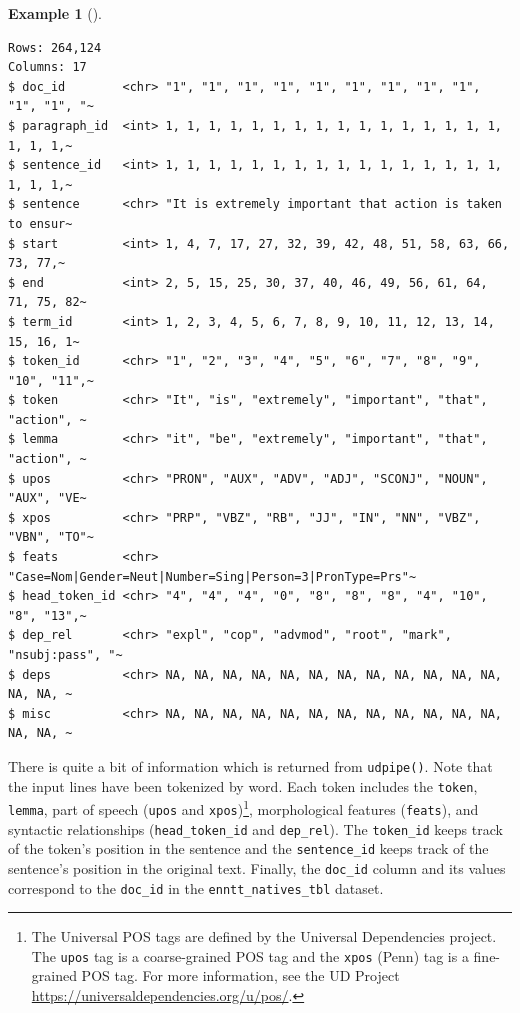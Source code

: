 \documentclass[
  letterpaper,
  krantz1]{latex/krantz-mod}
\theoremstyle{definition}
\theoremstyle{definition}
\newtheorem{example}{Example}[chapter]
\theoremstyle{remark}
\begin{document}
\begin{example}[]
\begin{verbatim}
Rows: 264,124
Columns: 17
$ doc_id        <chr> "1", "1", "1", "1", "1", "1", "1", "1", "1", "1", "1", "~
$ paragraph_id  <int> 1, 1, 1, 1, 1, 1, 1, 1, 1, 1, 1, 1, 1, 1, 1, 1, 1, 1, 1,~
$ sentence_id   <int> 1, 1, 1, 1, 1, 1, 1, 1, 1, 1, 1, 1, 1, 1, 1, 1, 1, 1, 1,~
$ sentence      <chr> "It is extremely important that action is taken to ensur~
$ start         <int> 1, 4, 7, 17, 27, 32, 39, 42, 48, 51, 58, 63, 66, 73, 77,~
$ end           <int> 2, 5, 15, 25, 30, 37, 40, 46, 49, 56, 61, 64, 71, 75, 82~
$ term_id       <int> 1, 2, 3, 4, 5, 6, 7, 8, 9, 10, 11, 12, 13, 14, 15, 16, 1~
$ token_id      <chr> "1", "2", "3", "4", "5", "6", "7", "8", "9", "10", "11",~
$ token         <chr> "It", "is", "extremely", "important", "that", "action", ~
$ lemma         <chr> "it", "be", "extremely", "important", "that", "action", ~
$ upos          <chr> "PRON", "AUX", "ADV", "ADJ", "SCONJ", "NOUN", "AUX", "VE~
$ xpos          <chr> "PRP", "VBZ", "RB", "JJ", "IN", "NN", "VBZ", "VBN", "TO"~
$ feats         <chr> "Case=Nom|Gender=Neut|Number=Sing|Person=3|PronType=Prs"~
$ head_token_id <chr> "4", "4", "4", "0", "8", "8", "8", "4", "10", "8", "13",~
$ dep_rel       <chr> "expl", "cop", "advmod", "root", "mark", "nsubj:pass", "~
$ deps          <chr> NA, NA, NA, NA, NA, NA, NA, NA, NA, NA, NA, NA, NA, NA, ~
$ misc          <chr> NA, NA, NA, NA, NA, NA, NA, NA, NA, NA, NA, NA, NA, NA, ~
\end{verbatim}

\end{example}

There is quite a bit of information which is returned from
\texttt{udpipe()}. Note that the input lines have been tokenized by
word. Each token includes the \texttt{token},
\texttt{lemma}, part of speech
(\texttt{upos} and \texttt{xpos})\footnote{The Universal POS tags are
  defined by the Universal Dependencies project. The \texttt{upos} tag
  is a coarse-grained POS tag and the \texttt{xpos} (Penn) tag is a
  fine-grained POS tag. For more information, see the UD Project
  \url{https://universaldependencies.org/u/pos/}.}, morphological
features (\texttt{feats}), and syntactic
relationships (\texttt{head\_token\_id}
and \texttt{dep\_rel}). The \texttt{token\_id} keeps track of the
token's position in the sentence and the \texttt{sentence\_id} keeps
track of the sentence's position in the original text. Finally, the
\texttt{doc\_id} column and its values correspond to the
\texttt{doc\_id} in the \texttt{enntt\_natives\_tbl} dataset.
\end{document}
